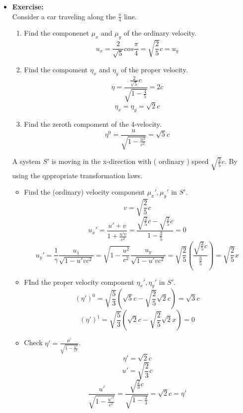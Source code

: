 \documentclass[fleqn,a4paper,12pt]{article}
\begin{document}
\begin{itemize}
\begin{itemize}
        \item \textbf{Exercise:}\\
          Consider a car traveling along the $\frac{\pi}{4}$ line.\\
          \begin{enumerate}
            \item 
              Find the componenet $\mu_x$ and $\mu_y$ of the ordinary velocity.\\
              \[ u_x = \frac{ 2 }{ \sqrt{ 5 } } cos \frac{\pi}{4} = \sqrt{ \frac{2}{5} } c = u_y \]
            \item
              Find the compoment $\eta_x$ and $\eta_y$ of the proper velocity.
              \[ \eta = \frac{ \frac{2}{\sqrt{5}}c }{ \sqrt{ 1 - \frac{4}{5} } } = 2c \]
              \[ \eta_x = \eta_y = \sqrt{2}c \]
            \item
              Find the zeroth compoment of the 4-velocity.
              \[ \eta^0 = \frac{u}{ \sqrt{ 1 - \frac{u^2}{c^2} } } = \sqrt{5} c \]
          \end{enumerate}
          A system $S'$ is moving in the x-direction with ( ordinary ) speed $ \sqrt{ \frac{2}{5} } c $. By using the qppropriate transformation laws.
          \begin{itemize}
          \item
            Find the (ordinary) velocity component $\mu_x',\mu_y'$ in $S'$.
            \[v = \sqrt{ \frac{ 2 }{ 5 } } c  \]
            \[ u_x' = \frac{u'+v}{1+\frac{u'v}{c^2}} = \frac{ \sqrt{ \frac{ 2 }{ 5 } } c - \sqrt{ \frac{ 2 }{ 5 } } c }{ 1 - \frac{2}{5}} = 0 \]
            \[ u_y' = \frac{1}{\gamma } \frac{u_1}{\sqrt{ 1 - {u'v}{c^2} } }  = \sqrt{ 1 - \frac{u^2}{c^2} }
              \frac{ u_y }{\sqrt{ 1 - {u'v}{c^2} } }   
= \sqrt{ \frac{2}{5} }( \frac{ \sqrt{ \frac{2}{5} } c }{ \frac{3}{5} } ) = \sqrt{ \frac{2}{5} } x \]
          \item
            FInd the proper velocity component $\eta_x', \eta_y'$ in $S'$.
            \[ (\eta')^0 = \sqrt{ \frac{5}{3} } ( \sqrt{5} c -  \sqrt{ \frac{2}{5} } \sqrt{2} c ) = \sqrt{3}c \]
            \[ (\eta')^1 = \sqrt{ \frac{5}{3} }( \sqrt{2}c - \sqrt{ \frac{2}{5} } \sqrt{2} x ) = 0 \]
          \item
            Check $ \eta' = \frac{ \mu' }{ \sqrt{ 1 - \frac{u^2}{c^2} } } $.
            \[ \eta' = \sqrt{2}c \]
            \[ u' = \sqrt{ \frac{2}{3} } c \]
            \[ \frac{u'}{ \sqrt{ 1 - \frac{ u'^2 }{ c ^2 } } } = \frac{ \sqrt{ \frac{2}{3} } c  }{ \sqrt{ 1 - \frac{2}{3} } } = \sqrt{2}c = \eta' \]
          \end{itemize} 
              

\end{itemize}
\end{itemize}
\end{document}
